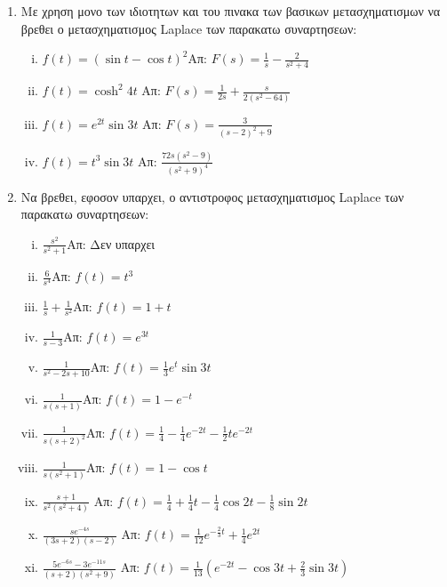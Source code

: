 



\everymath{\displaystyle}



\begin{center}
\end{center}

\vspace{\baselineskip}

\begin{enumerate}

\item Με χρηση μονο των ιδιοτητων και του πινακα των βασικων μετασχηματισμων να βρεθει ο μετασχηματισμος \textlatin{Laplace} των παρακατω συναρτησεων:

\begin{enumerate}[i)]

\item $f(t)=(\sin t-\cos t)^2$\hfill Απ: $F(s)=\frac{1}{s}-\frac{2}{s^2+4}$

\item $f(t)=\cosh^2 4t$ \hfill Απ: $F(s)=\frac{1}{2s}+\frac{s}{2(s^2-64)}$

\item $f(t)=e^{2t}\sin 3t$ \hfill Απ: $F(s)=\frac{3}{(s-2)^2+9}$


\item $f(t)=t^3\sin 3t$ \hfill Απ: $\frac{72s(s^2-9)}{(s^2+9)^4}$

\end{enumerate}

\item Να βρεθει, εφοσον υπαρχει, ο αντιστροφος μετασχηματισμος \textlatin{Laplace} των παρακατω συναρτησεων:

\begin{enumerate}[i)]

\item $\frac{s^2}{s^2+1}$\hfill Απ: Δεν υπαρχει
\item $\frac{6}{s^4}$\hfill Απ: $f(t)=t^3$
\item $\frac{1}{s}+\frac{1}{s^2}$\hfill Απ: $f(t)=1+t$
\item $\frac{1}{s-3}$\hfill Απ: $f(t)=e^{3t}$
\item $\frac{1}{s^2-2s+10}$\hfill Απ: $f(t)=\frac{1}{3}e^t\sin 3t$
\item $\frac{1}{s(s+1)}$\hfill Απ: $f(t)=1-e^{-t}$
\item $\frac{1}{s(s+2)^2}$\hfill Απ: $f(t)=\frac{1}{4}-\frac{1}{4}e^{-2t}-\frac{1}{2}te^{-2t}$
\item $\frac{1}{s(s^2+1)}$\hfill Απ: $f(t)=1-\cos t$
\item $\frac{s+1}{s^{2}(s^{2}+4)}$ \hfill Απ: $f(t)=\frac{1}{4}+\frac{1}{4}t-\frac{1}{4}\cos 2t -\frac{1}{8}\sin 2t$
\item $\frac{se^{-4s}}{(3s+2)(s-2)}$ \hfill Απ: $f(t)=\frac{1}{12}e^{-\frac{2}{3}t}+\frac{1}{4}e^{2t}$
\item $\frac{5e^{-6s}-3e^{-11s}}{(s+2)(s^{2}+9)}$ \hfill Απ: $f(t)=\frac{1}{13}(e^{-2t}-\cos 3t+\frac{2}{3}\sin 3t)$


\end{enumerate}
\end{enumerate}
